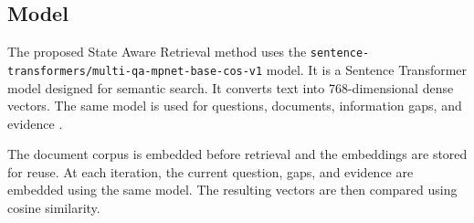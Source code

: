 \documentclass[12pt,a4paper]{report}
\begin{document}
\subsection{Model}

The proposed State Aware Retrieval method uses the
\texttt{sentence-transformers/\allowbreak multi-qa-mpnet-\allowbreak base-cos-v1} model.
It is a Sentence Transformer model designed for semantic search. It
converts text into 768-dimensional dense vectors. The same model is
used for questions, documents, information gaps, and evidence
\cite{reimers2019sentence,st2020mpnet}.

The document corpus is embedded before retrieval and the embeddings are
stored for reuse. At each iteration, the current question, gaps, and
evidence are embedded using the same model. The resulting vectors are
then compared using cosine similarity.
\end{document}
